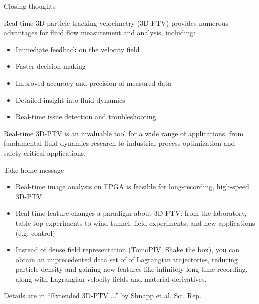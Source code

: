 \documentclass[aspectratio=169]{beamer}
\begin{document}



\begin{frame}{Closing thoughts}

Real-time 3D particle tracking velocimetry (3D-PTV) provides numerous advantages for fluid flow measurement and analysis, including:

\begin{itemize}
\item Immediate feedback on the velocity field
\item Faster decision-making
\item Improved accuracy and precision of measured data
\item Detailed insight into fluid dynamics
\item Real-time issue detection and troubleshooting
\end{itemize}

Real-time 3D-PTV is an invaluable tool for a wide range of applications, from fundamental fluid dynamics research to industrial process optimization and safety-critical applications.

\end{frame}


\begin{frame}{Take-home message}
  \begin{itemize}
  \item Real-time image analysis on FPGA is feasible for long-recording, high-speed 3D-PTV
  \item Real-time feature changes a paradigm about 3D-PTV: from the laboratory, table-top experiments to wind tunnel, field experiments, and new applications (e.g. control)
  \item Instead of dense field representation (TomoPIV, Shake the box),  you can obtain an unprecedented data set of of Lagrangian trajectories, reducing particle density and gaining new features like infinitely long time recording, along with Lagrangian velocity fields and material derivatives. 
  \end{itemize}
  
  \begin{cardTiny}\href{https://www.nature.com/articles/s41598-019-43555-2}{Details are in ``Extended 3D-PTV ...'' by Shnapp et al. Sci. Rep.}
  \end{cardTiny}
  
  \end{frame}
  
\end{document}
